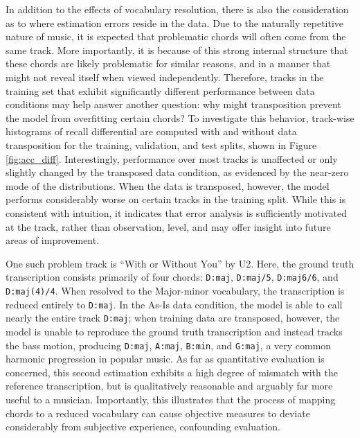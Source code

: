 In addition to the effects of vocabulary resolution, there is also the consideration as to where estimation errors reside in the data.
Due to the naturally repetitive nature of music, it is expected that problematic chords will often come from the same track.
More importantly, it is because of this strong internal structure that these chords are likely problematic for similar reasons, and in a manner that might not reveal itself when viewed independently.
Therefore, tracks in the training set that exhibit significantly different performance between data conditions may help answer another question: why might transposition prevent the model from overfitting certain chords?
To investigate this behavior, track-wise histograms of recall differential are computed with and without data transposition for the training, validation, and test splits, shown in Figure \ref{fig:acc_diff}.
Interestingly, performance over most tracks is unaffected or only slightly changed by the transposed data condition, as evidenced by the near-zero mode of the distributions.
When the data is transposed, however, the model performs considerably worse on certain tracks in the training split.
While this is consistent with intuition, %
it indicates that error analysis is sufficiently motivated at the track, rather than observation, level, and may offer insight into future areas of improvement.

One such problem track is ``With or Without You'' by U2.
Here, the ground truth transcription consists primarily of four chords: \texttt{D:maj}, \texttt{D:maj/5}, \texttt{D:maj6/6}, and \texttt{D:maj(4)/4}.
When resolved to the Major-minor vocabulary, the transcription is reduced entirely to \texttt{D:maj}.
In the As-Is data condition, the model is able to call nearly the entire track \texttt{D:maj};
when training data are transposed, however, the model is unable to reproduce the ground truth transcription and instead tracks the bass motion, producing \texttt{D:maj}, \texttt{A:maj}, \texttt{B:min}, and \texttt{G:maj}, a very common harmonic progression in popular music.
As far as quantitative evaluation is concerned, this second estimation exhibits a high degree of mismatch with the reference transcription, but is qualitatively reasonable and arguably far more useful to a musician.
Importantly, this illustrates that the process of mapping chords to a reduced vocabulary can cause objective measures to deviate considerably from subjective experience, confounding evaluation.


